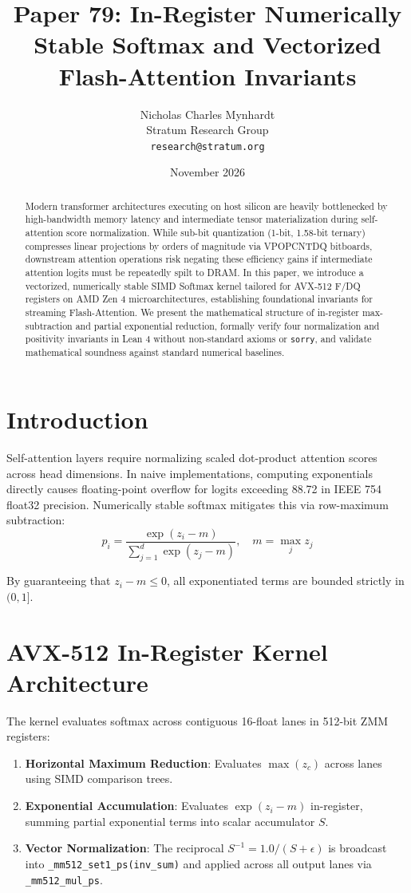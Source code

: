 \documentclass[10pt,twocolumn,letterpaper]{article}
\title{Paper 79: In-Register Numerically Stable Softmax and Vectorized Flash-Attention Invariants}
\author{Nicholas Charles Mynhardt \\ Stratum Research Group \\ \texttt{research@stratum.org}}
\date{November 2026}
\begin{document}
\maketitle

\begin{abstract}
Modern transformer architectures executing on host silicon are heavily bottlenecked by high-bandwidth memory latency and intermediate tensor materialization during self-attention score normalization. While sub-bit quantization (1-bit, 1.58-bit ternary) compresses linear projections by orders of magnitude via VPOPCNTDQ bitboards, downstream attention operations risk negating these efficiency gains if intermediate attention logits must be repeatedly spilt to DRAM. In this paper, we introduce a vectorized, numerically stable SIMD Softmax kernel tailored for AVX-512 F/DQ registers on AMD Zen 4 microarchitectures, establishing foundational invariants for streaming Flash-Attention. We present the mathematical structure of in-register max-subtraction and partial exponential reduction, formally verify four normalization and positivity invariants in Lean 4 without non-standard axioms or \texttt{sorry}, and validate mathematical soundness against standard numerical baselines.
\end{abstract}

\section{Introduction}
Self-attention layers require normalizing scaled dot-product attention scores across head dimensions. In naive implementations, computing exponentials directly causes floating-point overflow for logits exceeding 88.72 in IEEE 754 float32 precision. Numerically stable softmax mitigates this via row-maximum subtraction:
\begin{equation}
p_i = \frac{\exp(z_i - m)}{\sum_{j=1}^d \exp(z_j - m)}, \quad m = \max_{j} z_j
\end{equation}

By guaranteeing that $z_i - m \le 0$, all exponentiated terms are bounded strictly in $(0, 1]$.

\section{AVX-512 In-Register Kernel Architecture}
The kernel evaluates softmax across contiguous 16-float lanes in 512-bit ZMM registers:
\begin{enumerate}
    \item \textbf{Horizontal Maximum Reduction}: Evaluates $\max(z_c)$ across lanes using SIMD comparison trees.
    \item \textbf{Exponential Accumulation}: Evaluates $\exp(z_i - m)$ in-register, summing partial exponential terms into scalar accumulator $S$.
    \item \textbf{Vector Normalization}: The reciprocal $S^{-1} = 1.0 / (S + \epsilon)$ is broadcast into \texttt{\_mm512\_set1\_ps(inv\_sum)} and applied across all output lanes via \texttt{\_mm512\_mul\_ps}.
\end{enumerate}
\end{document}
